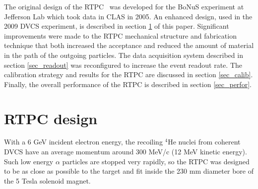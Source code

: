 \documentclass[preprint,5p]{elsarticle}
\begin{document}
The original design of the RTPC~\cite{BONUS-NIM} was developed for the BoNuS 
experiment at Jefferson Lab which took data in CLAS in 2005. An enhanced design, 
used in the 2009 DVCS experiment, is described in section \ref{sec_design} 
of this paper. Significant improvements were made to the RTPC mechanical 
structure and fabrication technique that both increased the acceptance and 
reduced the amount of material in the path of the outgoing particles. The 
data acquisition system described in section \ref{sec_readout} was reconfigured 
to increase the event readout rate. The calibration strategy and results for 
the RTPC are discussed in section \ref{sec_calib}. Finally, the overall performance
of the RTPC is described in section \ref{sec_perfor}.

\section{RTPC design} \label{sec_design}

With a 6 GeV incident electron energy, the recoiling $^{4}$He nuclei from coherent 
DVCS have an average momentum around 300 MeV/c (12 MeV kinetic energy). Such low energy $\alpha$ 
particles are stopped very rapidly, so the RTPC was designed to be as close 
as possible to the target and fit inside the 230 mm diameter bore of the 
5 Tesla solenoid magnet. 
\end{document}
